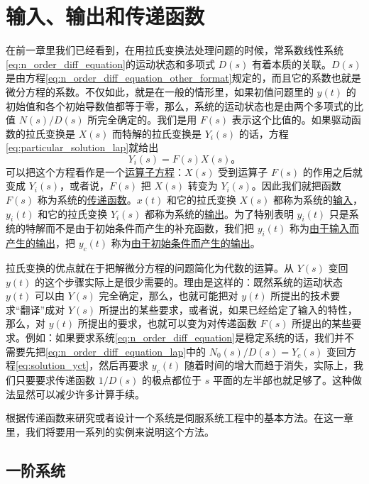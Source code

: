 
\chapter{输入、输出和传递函数}

在前一章里我们已经看到，在用拉氏变换法处理问题的时候，常系数线性系统\eqref{eq:n_order_diff_equation}的运动状态和多项式 $D(s)$ 有着本质的关联。$D(s)$ 是由方程\eqref{eq:n_order_diff_equation_other_format}规定的，而且它的系数也就是微分方程的系数。不仅如此，就是在一般的情形里，如果初值问题里的 $y(t)$ 的初始值和各个初始导数值都等于零，那么，系统的运动状态也是由两个多项式的比值 $N(s)/D(s)$ 所完全确定的。我们是用 $F(s)$ 表示这个比值的。如果驱动函数的拉氏变换是 $X(s)$ 而特解的拉氏变换是 $Y_i(s)$ 的话，方程\eqref{eq:particular_solution_lap}就给出
\begin{equation}
Y_i(s) = F(s)X(s)。
\end{equation}
可以把这个方程看作是一个\underline{运算子方程}：$X(s)$ 受到运算子 $F(s)$ 的作用之后就变成 $Y_i(s)$，或者说，$F(s)$ 把 $X(s)$ 转变为 $Y_i(s)$。因此我们就把函数 $F(s)$ 称为系统的\underline{传递函数}。$x(t)$ 和它的拉氏变换 $X(s)$ 都称为系统的\underline{输入}，$y_i(t)$ 和它的拉氏变换 $Y_i(s)$ 都称为系统的\underline{输出}。为了特别表明 $y_i(t)$ 只是系统的特解而不是由于初始条件而产生的补充函数，我们把 $y_i(t)$ 称为\underline{由于输入而产生的输出}，把 $y_c(t)$ 称为\underline{由于初始条件而产生的输出}。

拉氏变换的优点就在于把解微分方程的问题简化为代数的运算。从 $Y(s)$ 变回 $y(t)$ 的这个步骤实际上是很少需要的。理由是这样的：既然系统的运动状态 $y(t)$ 可以由 $Y(s)$ 完全确定，那么，也就可能把对 $y(t)$ 所提出的技术要求“翻译”成对 $Y(s)$ 所提出的某些要求，或者说，如果已经给定了输入的特性，那么，对 $y(t)$ 所提出的要求，也就可以变为对传递函数 $F(s)$ 所提出的某些要求。例如：如果要求系统\eqref{eq:n_order_diff_equation}是稳定系统的话，我们并不需要先把\eqref{eq:n_order_diff_equation_lap}中的 $N_0(s)/D(s) = Y_c(s)$ 变回方程\eqref{eq:solution_yct}，然后再要求 $y_c(t)$ 随着时间的增大而趋于消失，实际上，我们只要要求传递函数 $1/D(s)$ 的极点都位于 $s$ 平面的左半部也就足够了。这种做法显然可以减少许多计算手续。

根据传递函数来研究或者设计一个系统是伺服系统工程中的基本方法。在这一章里，我们将要用一系列的实例来说明这个方法。


\section{一阶系统}\label{first_order_system}

